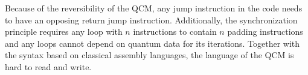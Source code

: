 Because of the reversibility of the QCM, any jump instruction in the code needs to have an opposing return jump instruction. Additionally, the synchronization principle requires any loop with $n$ instructions to contain $n$ padding instructions and any loops cannot depend on quantum data for its iterations. 
Together with the syntax based on classical assembly languages, the language of the QCM is hard to read and write. 

